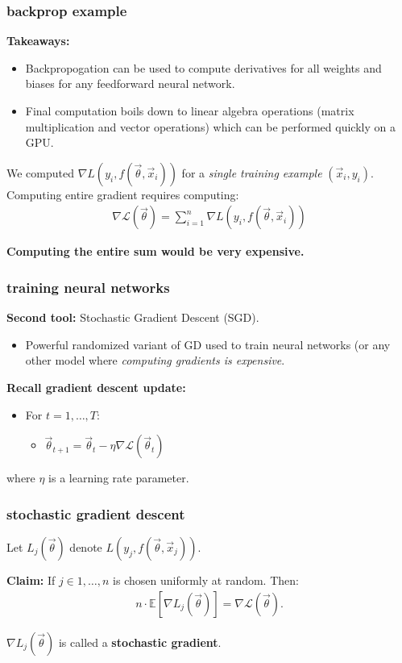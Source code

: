 \documentclass[handout,compress]{beamer}
\newcommand{\E}{\mathbb{E}}
\begin{document}
\begin{frame}
	\frametitle{backprop example}
	\textbf{Takeaways:}
	\begin{itemize}
		\item Backpropogation can be used to compute derivatives for all weights and biases for any feedforward neural network.
		\item Final computation boils down to linear algebra operations (matrix multiplication and vector operations) which can be performed quickly on a GPU.
	\end{itemize}

We computed $\nabla L\left(y_i,f(\vec{\theta}, \vec{x}_i)\right)$ for a \emph{single training example} $(\vec{x}_i, y_i)$. Computing entire gradient requires computing:
	\begin{align*}
\nabla \mathcal{L}(\vec{\theta}) = \sum_{i=1}^n \nabla L\left(y_i,f(\vec{\theta},\vec{x}_i)\right)
\end{align*}
\begin{center}
	\textbf{Computing the entire sum would be very expensive.}
\end{center}
\end{frame}

\begin{frame}
	\frametitle{training neural networks}
	\textbf{Second tool:} Stochastic Gradient Descent (SGD).
	\begin{itemize}
		\item Powerful {randomized} variant of GD used to train neural networks (or any other model where \emph{computing gradients is expensive}.
	\end{itemize}
\vspace{2em}
	\textbf{Recall gradient descent update:}
	\begin{itemize}
		\item For $t = 1, \ldots, T$:
		\begin{itemize}
		\item $\vec{\theta}_{t+1} = \vec{\theta}_{t} - \eta \nabla \mathcal{L}(\vec{\theta}_t)$
		\end{itemize}
	\end{itemize}
where $\eta$ is a learning rate parameter. 
\end{frame}

\begin{frame}
	\frametitle{stochastic gradient descent}
	Let $L_j(\vec{\theta})$ denote $L\left(y_j,f(\vec{\theta},\vec{x}_j)\right)$.
	
	\textbf{Claim:} If $j \in 1, \ldots, n$ is chosen uniformly at random. Then:
	\begin{align*}
	n\cdot\E\left[\nabla L_j(\vec{\theta}) \right] = \nabla \mathcal{L}(\vec{\theta}).
	\end{align*}
	\vspace{5em}
	
	$\nabla L_j(\vec{\theta})$ is called a \textbf{\alert{stochastic gradient}}.
\end{frame}
\end{document}
